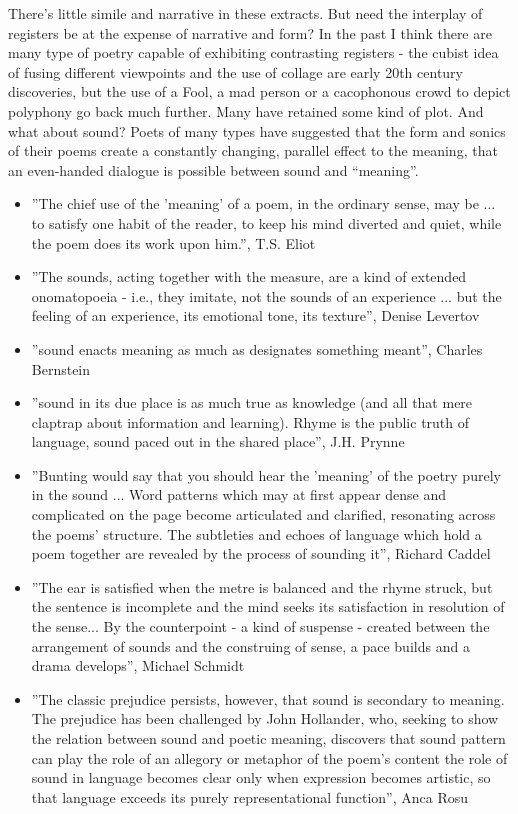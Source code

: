 \documentclass[11pt]{article}
\begin{document}
There's little simile and narrative in these extracts. But need the interplay of registers be at the expense of narrative and form? In the past I think there are many type of poetry capable of exhibiting contrasting registers - the cubist idea of fusing different viewpoints and the use of collage are early 20th century discoveries, but the use of a Fool, a mad person or a cacophonous crowd to depict polyphony go back much further. Many have retained some kind of plot. And what about sound?  Poets of many types have suggested that the form and sonics of their poems create a constantly changing, parallel effect to the meaning, that an even-handed dialogue is possible between sound and ``meaning''. 
\begin{itemize} 
\item ''The chief use of the 'meaning' of a poem, in the ordinary sense, may be ... to satisfy one habit of the reader, to keep his mind diverted and quiet, while the poem does its work upon him.'', T.S. Eliot
\item ''The sounds, acting together with the measure, are a kind of extended onomatopoeia - i.e., they imitate, not the sounds of an experience ... but the feeling of an experience, its emotional tone, its texture'', Denise Levertov
\item ''sound enacts meaning as much as designates something meant'', Charles Bernstein
\item ''sound in its due place is as much true as knowledge (and all that mere claptrap about information and learning). Rhyme is the public truth of language, sound paced out in the shared place'', J.H. Prynne

\item ''Bunting would say that you should hear the 'meaning' of the poetry purely in the sound ... Word patterns which may at first appear dense and complicated on the page become articulated and clarified, resonating across the poems' structure. The subtleties and echoes of language which hold a poem together are revealed by the process of sounding it'', Richard Caddel

\item ''The ear is satisfied when the metre is balanced and the rhyme struck, but the sentence is incomplete and the mind seeks its satisfaction in resolution of the sense... By the counterpoint - a kind of suspense - created between the arrangement of sounds and the construing of sense, a pace builds and a drama develops'', Michael Schmidt

\item ''The classic prejudice persists, however, that sound is secondary to meaning. The prejudice has been challenged by John Hollander, who, seeking to show the relation between sound and poetic meaning, discovers that sound pattern can play the role of an allegory or metaphor of the poem's content the role of sound in language becomes clear only when expression becomes artistic, so that language exceeds its purely representational function'', Anca Rosu
\end{itemize}
\end{document}

